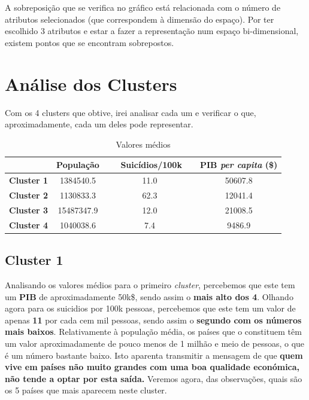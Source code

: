 \documentclass[a4paper,12pt]{article}
\begin{document}
A sobreposição que se verifica no gráfico está relacionada com o número de atributos selecionados (que correspondem à dimensão do espaço). Por ter escolhido 3 atributos e estar a fazer a representação num espaço bi-dimensional, existem pontos que se encontram sobrepostos.

\section{Análise dos Clusters}

Com os 4 clusters que obtive, irei analisar cada um e verificar o que, aproximadamente, cada um deles pode representar.

\begin{table}[H]
	\centering
	\caption{Valores médios}
	\label{table:medios}
	\begin{tabular}{|c|c|c|c|} 
		\hline
		\rowcolor[rgb]{0.706,0.922,0.996} \multicolumn{1}{|l|}{} & \textbf{ População } & \textbf{~ ~Suicídios/100k~~ } & \textbf{PIB \textit{per capita} (\$)}  \\ 
		\hline
		{\cellcolor[rgb]{0.706,0.922,0.996}}\textbf{Cluster 1}   & 1384540.5            & 11.0                          & 50607.8                           \\ 
		\hline
		{\cellcolor[rgb]{0.706,0.922,0.996}}\textbf{Cluster 2}   & 1130833.3            & 62.3                          & 12041.4                           \\ 
		\hline
		{\cellcolor[rgb]{0.706,0.922,0.996}}\textbf{Cluster 3}   & 15487347.9           & 12.0                          & 21008.5                           \\ 
		\hline
		{\cellcolor[rgb]{0.706,0.922,0.996}}\textbf{Cluster 4}   & 1040038.6            & 7.4                           & 9486.9                            \\
		\hline
	\end{tabular}
\end{table}


\subsection{Cluster 1}
Analisando os valores médios para o primeiro \textit{cluster}, percebemos que este tem um \textbf{PIB} de aproximadamente 50k\$, sendo assim o \textbf{mais alto dos 4}. Olhando agora para os suicidios por 100k pessoas, percebemos que este tem um valor de apenas \textbf{11} por cada cem mil pessoas, sendo assim o \textbf{segundo com os números mais baixos}. Relativamente à população média, os países que o constituem têm um valor aproximadamente de pouco menos de 1 milhão e meio de pessoas, o que é um número bastante baixo. Isto aparenta transmitir a mensagem de que \textbf{quem vive em países não muito grandes com uma boa qualidade económica, não tende a optar por esta saída.}
Veremos agora, das observações, quais são os 5 países que mais aparecem neste cluster.
\end{document}
